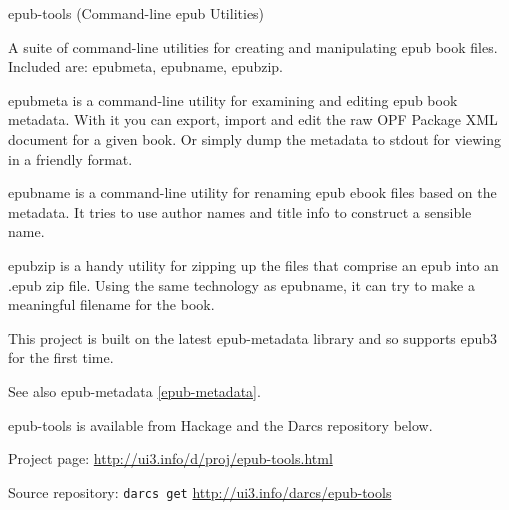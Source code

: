 \begin{hcarentry}{epub-tools (Command-line epub Utilities)}
\label{epubtools}
\makeheader

A suite of command-line utilities for creating and manipulating epub book files. Included are: epubmeta, epubname, epubzip.

epubmeta is a command-line utility for examining and editing epub book metadata. With it you can export, import and edit the raw OPF Package XML document for a given book. Or simply dump the metadata to stdout for viewing in a friendly format.

epubname is a command-line utility for renaming epub ebook files based on the metadata. It tries to use author names and title info to construct a sensible name.

epubzip is a handy utility for zipping up the files that comprise an epub into an .epub zip file. Using the same technology as epubname, it can try to make a meaningful filename for the book.

This project is built on the latest epub-metadata library and so supports epub3 for the first time.

See also epub-metadata \cref{epub-metadata}.

epub-tools is available from Hackage and the Darcs repository below.

\FurtherReading
\begin{compactitem}
\item Project page:
\url{http://ui3.info/d/proj/epub-tools.html}

\item Source repository:
\texttt{darcs get} \url{http://ui3.info/darcs/epub-tools}
\end{compactitem}
\end{hcarentry}
